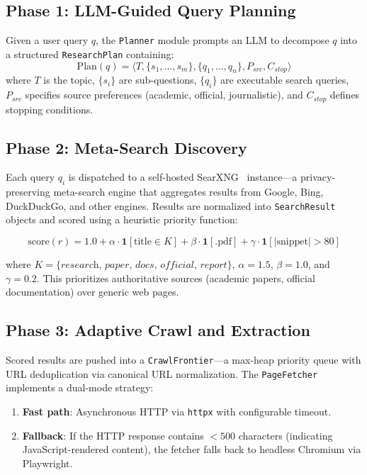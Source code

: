 \documentclass[conference]{IEEEtran}
\begin{document}
\subsection{Phase 1: LLM-Guided Query Planning}

Given a user query $q$, the \texttt{Planner} module prompts an LLM to decompose $q$ into a structured \texttt{ResearchPlan} containing:
\begin{equation}
\text{Plan}(q) = \langle T, \{s_1, \ldots, s_m\}, \{q_1, \ldots, q_n\}, P_{src}, C_{stop} \rangle
\end{equation}
where $T$ is the topic, $\{s_i\}$ are sub-questions, $\{q_i\}$ are executable search queries, $P_{src}$ specifies source preferences (academic, official, journalistic), and $C_{stop}$ defines stopping conditions.

\subsection{Phase 2: Meta-Search Discovery}

Each query $q_i$ is dispatched to a self-hosted SearXNG~\cite{searxng} instance---a privacy-preserving meta-search engine that aggregates results from Google, Bing, DuckDuckGo, and other engines. Results are normalized into \texttt{SearchResult} objects and scored using a heuristic priority function:

\begin{equation}
\text{score}(r) = 1.0 + \alpha \cdot \mathbf{1}[\text{title} \in K]
                       + \beta  \cdot \mathbf{1}[\text{.pdf}]
                       + \gamma \cdot \mathbf{1}[|\text{snippet}| > 80]
\label{eq:scoring}
\end{equation}

where $K = \{\textit{research, paper, docs, official, report}\}$, $\alpha = 1.5$, $\beta = 1.0$, and $\gamma = 0.2$. This prioritizes authoritative sources (academic papers, official documentation) over generic web pages.

\subsection{Phase 3: Adaptive Crawl and Extraction}

Scored results are pushed into a \texttt{CrawlFrontier}---a max-heap priority queue with URL deduplication via canonical URL normalization. The \texttt{PageFetcher} implements a dual-mode strategy:

\begin{enumerate}
    \item \textbf{Fast path}: Asynchronous HTTP via \texttt{httpx} with configurable timeout.
    \item \textbf{Fallback}: If the HTTP response contains $<500$ characters (indicating JavaScript-rendered content), the fetcher falls back to headless Chromium via Playwright.
\end{enumerate}
\end{document}

